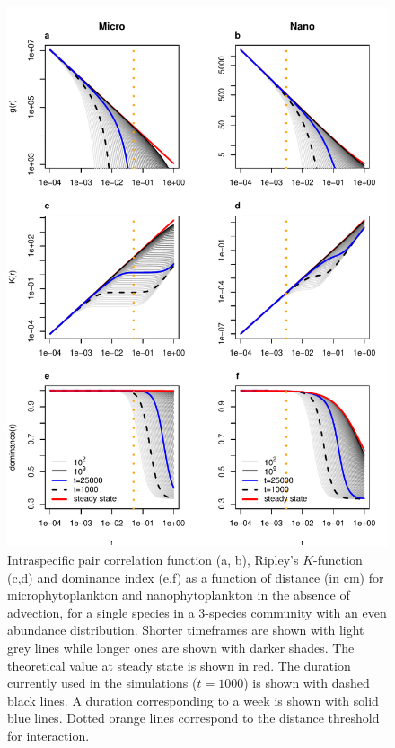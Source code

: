 \documentclass[english]{article}
\begin{document}
\begin{figure}[H]
\begin{centering}
\includegraphics[height=0.9\textheight]{../code/figure/convergence_wo_advection}
\par\end{centering}
\caption{Intraspecific pair correlation function (a, b), Ripley's $K$-function
(c,d) and dominance index (e,f) as a function of distance (in cm)
for microphytoplankton and nanophytoplankton in the absence of advection,
for a single species in a 3-species community with an even abundance
distribution. Shorter timeframes are shown with light grey lines while
longer ones are shown with darker shades. The theoretical value at
steady state is shown in red. The duration currently used in the simulations
($t=1000$) is shown with dashed black lines. A duration corresponding
to a week is shown with solid blue lines. Dotted orange lines correspond
to the distance threshold for interaction.\label{fig:Theoretical-convergence}}
\end{figure}
\end{document}
